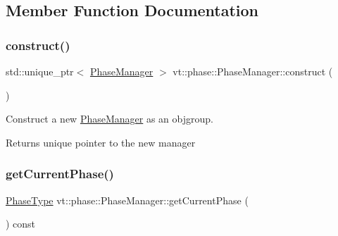 \subsection{Member Function Documentation}
\mbox{\label{structvt_1_1phase_1_1_phase_manager_a6d864be02daa1cc0ec0b336aa1ebc31e}} 
\subsubsection{\texorpdfstring{construct()}{construct()}}
{\footnotesize\ttfamily std\+::unique\+\_\+ptr$<$ \hyperlink{structvt_1_1phase_1_1_phase_manager}{Phase\+Manager} $>$ vt\+::phase\+::\+Phase\+Manager\+::construct (\begin{DoxyParamCaption}{ }\end{DoxyParamCaption})\hspace{0.3cm}{\ttfamily [static]}}



Construct a new {\ttfamily \hyperlink{structvt_1_1phase_1_1_phase_manager}{Phase\+Manager}} as an objgroup. 

\begin{DoxyReturn}{Returns}
unique pointer to the new manager 
\end{DoxyReturn}
\mbox{\label{structvt_1_1phase_1_1_phase_manager_a217ff68fb553eedf12c9f4947a977ebd}} 
\subsubsection{\texorpdfstring{get\+Current\+Phase()}{getCurrentPhase()}}
{\footnotesize\ttfamily \hyperlink{namespacevt_a46ce6733d5cdbd735d561b7b4029f6d7}{Phase\+Type} vt\+::phase\+::\+Phase\+Manager\+::get\+Current\+Phase (\begin{DoxyParamCaption}{ }\end{DoxyParamCaption}) const\hspace{0.3cm}{\ttfamily [inline]}}



